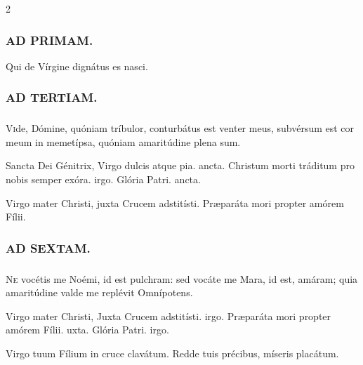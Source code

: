 \documentclass[9pt,twoside]{extarticle}
\begin{document}
\begin{multicols}{2}
\subsubsection*{\center \textsc{AD PRIMAM.}}
\begin{tightlist}{}
\item {} Qui de Vírgine dignátus es nasci.
\end{tightlist}

\subsubsection*{\center \textsc{AD TERTIAM.}}
\subsubsection*{}
\lettrine{V}ide, Dómine, quóniam tríbulor, conturbátus est venter meus, subvérsum est cor meum in memetípsa, quóniam amaritúdine plena sum.

\begin{tightlist}{}
\item {} Sancta Dei Génitrix, \textred{*} Virgo dulcis atque pia. ancta.  Christum morti tráditum pro nobis semper exóra. irgo. Glória Patri. ancta.
\item {} Virgo mater Christi, juxta Crucem adstitísti.  Præparáta mori propter amórem Fílii.
\end{tightlist}

\subsubsection*{\center \textsc{AD SEXTAM.}}
\subsubsection*{}
\lettrine{N}e vocétis me Noémi, id est pulchram: sed vocáte me Mara, id est, amáram; quia amaritúdine valde me replévit Omnípotens.

\begin{tightlist}{}
\item {} Virgo mater Christi, \textred{*} Juxta Crucem adstitísti. irgo.  Præparáta mori propter amórem Fílii. uxta. Glória Patri. irgo.
\item {} Virgo tuum Fílium in cruce clavátum.  Redde tuis précibus, míseris placátum.
\end{tightlist}


\end{multicols}
\end{document}
